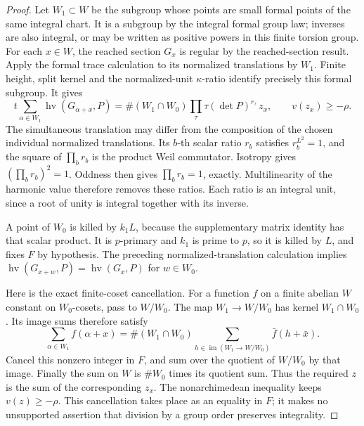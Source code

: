 \begin{proof}
Let \(W_1\subset W\) be the subgroup whose points are small formal
points of the same integral chart.
It is a subgroup by the integral formal group law; inverses are
also integral, or may be written as positive powers in this finite
torsion group.
For each \(x\in W\), the reached section \(G_x\) is regular by the
reached-section result.
Apply the formal trace calculation to its normalized translations
by \(W_1\).
Finite height, split kernel and the normalized-unit
\(\kappa\)-ratio identify precisely this formal subgroup.
It gives
\[
 t\sum_{\alpha\in W_1}\operatorname{hv}(G_{\alpha+x},P)
       =\#(W_1\cap W_0)
             \prod_\tau\tau(\det P)^{r_\tau}\,z_x,
 \qquad v(z_x)\ge-\rho .
\]
The simultaneous translation may differ from the composition of the
chosen individual normalized translations.
Its \(b\)-th scalar ratio \(r_b\) satisfies \(r_b^{L^2}=1\), and
the square of \(\prod_b r_b\) is the product Weil commutator.
Isotropy gives \((\prod_b r_b)^2=1\).
Oddness then gives \(\prod_b r_b=1\), exactly.
Multilinearity of the harmonic value therefore removes these
ratios.  Each ratio is an integral unit, since a root of unity
is integral together with its inverse.

A point of \(W_0\) is killed by \(k_1L\), because the supplementary
matrix identity has that scalar product.
It is \(p\)-primary and \(k_1\) is prime to \(p\), so it is killed
by \(L\), and fixes \(F\) by hypothesis.
The preceding normalized-translation calculation implies
\(\operatorname{hv}(G_{x+w},P)=\operatorname{hv}(G_x,P)\)
for \(w\in W_0\).

Here is the exact finite-coset cancellation.
For a function \(f\) on a finite abelian \(W\) constant on
\(W_0\)-cosets, pass to \(W/W_0\).
The map \(W_1\to W/W_0\) has kernel \(W_1\cap W_0\).
Its image sums therefore satisfy
\[
 \sum_{\alpha\in W_1} f(\alpha+x)
   =\#(W_1\cap W_0)
       \sum_{h\in\operatorname{im}(W_1\to W/W_0)}\bar f(h+\bar x).
\]
Cancel this nonzero integer in \(F\), and sum over the quotient of
\(W/W_0\) by that image.
Finally the sum on \(W\) is \(\#W_0\) times its quotient sum.
Thus the required \(z\) is the sum of the corresponding \(z_x\).
The nonarchimedean inequality keeps \(v(z)\ge-\rho\).
This cancellation takes place as an equality in \(F\); it makes
no unsupported assertion that division by a group order preserves
integrality.
\end{proof}

